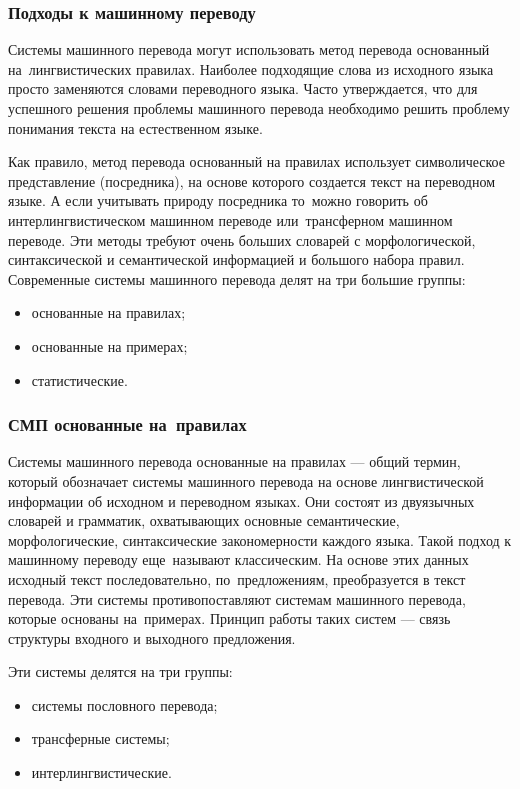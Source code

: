 
\subsubsection{Подходы к машинному переводу}

Системы машинного перевода могут использовать метод перевода основанный 
на~лингвистических правилах. 
Наиболее подходящие слова из исходного языка просто 
заменяются словами переводного языка.
Часто утверждается, что для успешного решения проблемы машинного перевода 
необходимо решить проблему понимания текста на естественном языке.

Как правило, метод перевода основанный на правилах использует 
символическое представление (посредника), на основе которого создается 
текст на переводном языке. А если учитывать природу посредника 
то~можно говорить об интерлингвистическом машинном 
переводе или~трансферном машинном переводе. 
Эти методы требуют очень больших словарей с морфологической, 
синтаксической и семантической информацией и большого набора правил. 
Современные системы машинного перевода делят на три большие группы:
\begin{itemize}
	\item  основанные на правилах;
	\item  основанные на примерах;
	\item  статистические.
\end{itemize}

\pagebreak

\subsubsection{СМП основанные на~правилах}
Системы машинного перевода основанные на правилах --- общий термин, 
который обозначает системы машинного перевода 
на основе лингвистической информации об исходном и переводном языках. 
Они состоят из двуязычных словарей и грамматик, 
охватывающих основные семантические, морфологические, 
синтаксические закономерности каждого языка. 
Такой подход к машинному переводу еще~называют классическим.
На основе этих данных исходный текст последовательно, 
по~предложениям, преобразуется в текст перевода. 
Эти системы противопоставляют системам машинного перевода, 
которые основаны на~примерах.
Принцип работы таких систем --- 
связь структуры входного и выходного предложения. 

Эти системы делятся на три группы:
\begin{itemize}
	\item системы пословного перевода;
	\item трансферные системы;
	\item интерлингвистические.
\end{itemize}

